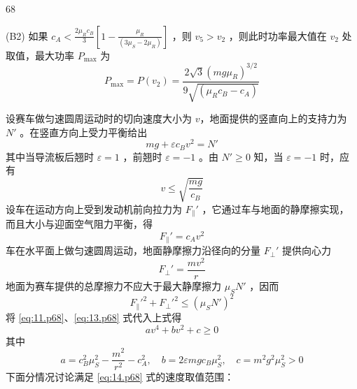 \begin{solution}{68}
\begin{subsolution}
        (B2) 如果 $c_{A} < \frac{2\mu_{R} c_{B}}{3}\left[1 - \frac{\mu_{R}}{(3\mu_{S} - 2\mu_{R})}\right]$ ，则 $v_{5} > v_{2}$ ，则此时功率最大值在 $v_{2}$ 处取值，最大功率 $P_{\max}$ 为
        \begin{equation}
            P_{\max} = P(v_{2}) = \frac{2\sqrt{3} (mg\mu_{R})^{3/2}}{9\sqrt{(\mu_{R} c_{B} - c_{A})}} \label{eq:10.p68}
        \end{equation}
    \end{subsolution}
    \begin{subsolution}
        设赛车做匀速圆周运动时的切向速度大小为 $v$，地面提供的竖直向上的支持力为 $N'$ 。在竖直方向上受力平衡给出
        \begin{equation}
            mg + \varepsilon c_{B} v^{2} = N' \label{eq:11.p68}
        \end{equation}
        其中当导流板后翘时 $\varepsilon=1$ ，前翘时 $\varepsilon=-1$ 。由 $N'\geq 0$ 知，当 $\varepsilon=-1$ 时，应有
        \begin{equation}
            v \leq \sqrt{\frac{mg}{c_{B}}} \label{eq:12.p68}
        \end{equation}
        设车在运动方向上受到发动机前向拉力为 $F_{\parallel}'$ ，它通过车与地面的静摩擦实现，而且大小与迎面空气阻力平衡，得
        \begin{equation*}
            F_{\parallel}' = c_{A} v^{2}
        \end{equation*}
        车在水平面上做匀速圆周运动，地面静摩擦力沿径向的分量 $F_{\perp}'$ 提供向心力
        \begin{equation}
            F_{\perp}' = \frac{m v^{2}}{r} \label{eq:13.p68}
        \end{equation}
        地面为赛车提供的总摩擦力不应大于最大静摩擦力 $\mu_{S} N'$ ，因而
        \begin{equation*}
            F_{\parallel}'^{2} + F_{\perp}'^{2} \leq (\mu_{S} N')^{2}
        \end{equation*}
        将 \eqref{eq:11.p68}、\eqref{eq:13.p68} 式代入上式得
        \begin{equation*}
            a v^{4} + b v^{2} + c \geq 0
        \end{equation*}
        其中
        \begin{equation}
            a = c_{B}^{2}\mu_{S}^{2} - \frac{m^{2}}{r^{2}} - c_{A}^{2},\quad b = 2\varepsilon m g c_{B}\mu_{S}^{2},\quad c = m^{2} g^{2}\mu_{S}^{2} > 0 \label{eq:14.p68}
        \end{equation}
        下面分情况讨论满足 \eqref{eq:14.p68} 式的速度取值范围：


\end{subsolution}
\end{solution}
